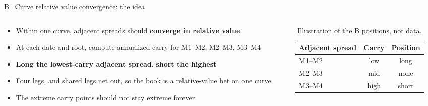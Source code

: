 \documentclass[10pt, aspectratio=169]{beamer}
\newcommand{\key}[1]{\textcolor{accent}{\textbf{#1}}}
\begin{document}
\begin{frame}{B \textperiodcentered\ Curve relative value convergence: the idea}
\label{sl:b}
\begin{columns}[c, onlytextwidth]
\begin{column}{0.55\textwidth}
\footnotesize
\begin{itemize}
  \item Within one curve, adjacent spreads should \key{converge in relative value}
  \item At each date and root, compute annualized carry for
        M1--M2, M2--M3, M3--M4
  \item \key{Long the lowest-carry adjacent spread}, \key{short the highest}
  \item Four legs, and shared legs net out, so the book is a relative-value bet
        on one curve
  \item The extreme carry points should not stay extreme forever
\end{itemize}
\end{column}
\begin{column}{0.42\textwidth}
\begin{table}
\centering
\scriptsize
\setlength{\tabcolsep}{4pt}
\begin{tabular}{@{}l c c@{}}
\toprule
Adjacent spread & Carry & Position \\
\midrule
M1--M2 & low  & long \\
M2--M3 & mid  & none \\
M3--M4 & high & short \\
\bottomrule
\end{tabular}
\caption{Illustration of the B positions, not data.}
\end{table}
\end{column}
\end{columns}
\end{frame}
\end{document}
